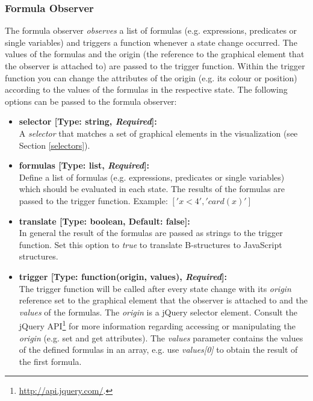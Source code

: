 \subsubsection{Formula Observer}

The formula observer \textit{observes} a list of formulas (e.g.  expressions, predicates or single variables) and triggers a function whenever a state change occurred.
The values of the formulas and the origin (the reference to the graphical element that the observer is attached to) are passed to the trigger function.
Within the trigger function you can change the attributes of the origin (e.g. its colour or position) according to the values of the formulas in the respective state.
The following options can be passed to the formula observer:

\begin{itemize}

\item[] \textbf{selector [Type: string, \textit{Required}]:}\\ A \textit{selector} that matches a set of graphical elements in the visualization (see Section \ref{selectors}).

\item[] \textbf{formulas [Type: list, \textit{Required}]:}\\
Define a list of formulas (e.g. expressions, predicates or single variables) which should be evaluated in each state.
The results of the formulas are passed to the trigger function.
Example: $['x < 4', 'card(x)']$

\item[] \textbf{translate [Type: boolean, Default: false]:}\\
In general the result of the formulas are passed as strings to the trigger function.
Set this option to \textit{true} to translate B-structures to JavaScript structures.

\item[] \textbf{trigger [Type: function(origin, values), \textit{Required}]:}\\
The trigger function will be called after every state change with its \textit{origin} reference set to the graphical element that the observer is attached to and the \textit{values} of the formulas. 
The \textit{origin} is a jQuery selector element.
Consult the jQuery API\footnote{\url{http://api.jquery.com/}.} for more information regarding accessing or manipulating the \textit{origin} (e.g. set and get attributes).
The \textit{values} parameter contains the values of the defined formulas in an array, e.g. use \textit{values[0]} to obtain the result of the first formula.


\end{itemize}
